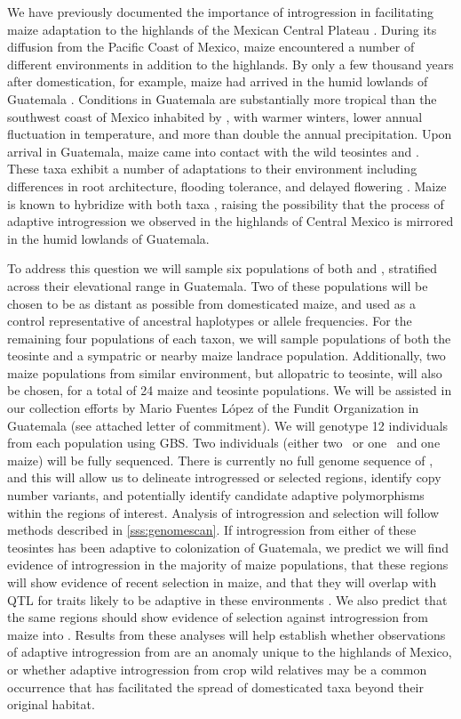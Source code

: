 We have previously documented the importance of introgression in facilitating maize adaptation to the highlands of the Mexican Central Plateau \citep{Hufford2013}.
During its diffusion from the Pacific Coast of Mexico, maize encountered a number of different environments in addition to the highlands.
By only a few thousand years after domestication, for example, maize had arrived in the humid lowlands of Guatemala \citep{neff2006early}.  
Conditions in Guatemala are substantially more tropical than the southwest coast of Mexico inhabited by \zp, with warmer winters, lower annual fluctuation in temperature, and more than double the annual precipitation.
Upon arrival in Guatemala, maize came into contact with the wild teosintes \zh{} and \zl.  
These taxa exhibit a number of adaptations to their environment including differences in root architecture, flooding tolerance, and delayed flowering \citep{wilkes1967teosinte, mano2006}.
Maize is known to hybridize with both taxa \citep{wilkes1967teosinte}, raising the possibility that the process of adaptive introgression we observed in the highlands of Central Mexico is mirrored in the humid lowlands of Guatemala.

To address this question we will sample six populations of both \zl{} and \zh{}, stratified across their elevational range in Guatemala.  
Two of these populations will be chosen to be as distant as possible from domesticated maize, and used as a control representative of ancestral haplotypes or allele frequencies.  
For the remaining four populations of each taxon, we will sample populations of both the teosinte and a sympatric or nearby maize landrace population.
Additionally, two maize populations from similar environment, but allopatric to teosinte, will also be chosen, for a total of 24 maize and teosinte populations.
We will be assisted in our collection efforts by Mario Fuentes L\'{o}pez of the Fundit Organization in Guatemala (see attached letter of commitment).
We will genotype 12 individuals from each population using GBS. 
Two individuals (either two \zl\ or one \zl\ and one maize) will be fully sequenced.
There is currently no full genome sequence of \zl, and this will allow us to delineate introgressed or selected regions, identify copy number variants, and potentially identify candidate adaptive polymorphisms within the regions of interest.
Analysis of introgression and selection will follow methods described in \ref{sss:genomescan}.
If introgression from either of these teosintes has been adaptive to colonization of Guatemala, we predict we will find evidence of introgression in the majority of maize populations, that these regions will show evidence of recent selection in maize, and that they will overlap with QTL for traits likely to be adaptive in these environments \citep[e.g.][]{omori2007qtl,mano2008linkage}.
We also predict that the same regions should show evidence of selection against introgression from maize into \zl.
Results from these analyses will help establish whether observations of adaptive introgression from \zm{} are an anomaly unique to the highlands of Mexico, or whether adaptive introgression from crop wild relatives may be a common occurrence that has facilitated the spread of domesticated taxa beyond their original habitat.

